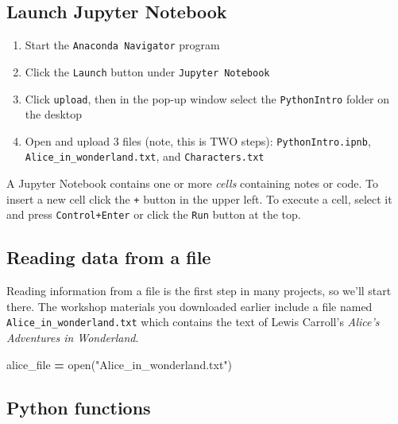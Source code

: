\documentclass[]{book}
\newenvironment{Shaded}{\begin{snugshade}}{\end{snugshade}}
\newcommand{\BuiltInTok}[1]{#1}
\newcommand{\NormalTok}[1]{#1}
\newcommand{\OperatorTok}[1]{\textcolor[rgb]{0.81,0.36,0.00}{\textbf{#1}}}
\newcommand{\StringTok}[1]{\textcolor[rgb]{0.31,0.60,0.02}{#1}}
\providecommand{\tightlist}{%
  \setlength{\itemsep}{0pt}\setlength{\parskip}{0pt}}
\begin{document}
\hypertarget{launch-jupyter-notebook}{%
\subsection{Launch Jupyter Notebook}\label{launch-jupyter-notebook}}

\begin{enumerate}
\def\labelenumi{\arabic{enumi}.}
\tightlist
\item
  Start the \texttt{Anaconda\ Navigator} program
\item
  Click the \texttt{Launch} button under \texttt{Jupyter\ Notebook}
\item
  Click \texttt{upload}, then in the pop-up window select the \texttt{PythonIntro} folder on the desktop
\item
  Open and upload 3 files (note, this is TWO steps): \texttt{PythonIntro.ipnb}, \texttt{Alice\_in\_wonderland.txt}, and \texttt{Characters.txt}
\end{enumerate}

A Jupyter Notebook contains one or more \emph{cells} containing notes or code. To insert a new cell click the \texttt{+} button in the upper left. To execute a cell, select it and press \texttt{Control+Enter} or click the \texttt{Run} button at the top.

\hypertarget{reading-data-from-a-file}{%
\subsection{Reading data from a file}\label{reading-data-from-a-file}}

Reading information from a file is the first step in many projects, so we'll start there. The workshop materials you downloaded earlier include a file named \texttt{Alice\_in\_wonderland.txt} which contains the text of Lewis Carroll's \emph{Alice's Adventures in Wonderland}.

\begin{Shaded}
\begin{Highlighting}[]
\NormalTok{alice_file }\OperatorTok{=} \BuiltInTok{open}\NormalTok{(}\StringTok{"Alice_in_wonderland.txt"}\NormalTok{)}
\end{Highlighting}
\end{Shaded}

\hypertarget{python-functions}{%
\subsection{Python functions}\label{python-functions}}
\end{document}

